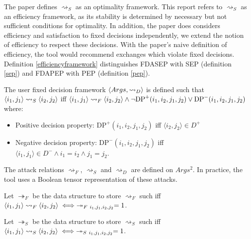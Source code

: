 The paper \cite{aes} defines $\rightsquigarrow_S$ as an optimality framework. This report refers to $\rightsquigarrow_S$ as an efficiency framework, as its stability is determined by necessary but not sufficient conditions for optimality. In addition, the paper does considers efficiency and satisfaction to fixed decisions independently, we extend the notion of efficiency to respect these decisions. With the paper's naive definition of efficiency, the tool would recommend exchanges which violate fixed decisions. Definition \ref{efficiencyframework} distinguishes FDASEP with SEP (definition \ref{sep}) and FDAPEP with PEP (definition \ref{pep}).

\begin{definition}
	\label{fixeddecisionframework}
	
	The user fixed decision framework $\langle{Args},{\rightsquigarrow_D}\rangle$ is defined such that $\langle{i_1},{j_1}\rangle\rightsquigarrow_S\langle{ i_2},{j_2}\rangle$ iff $\langle{i_1},{j_1}\rangle\rightsquigarrow_F\langle{i_2},{j_2}\rangle\land\neg\text{DP}^+(i_1,i_2,j_1,j_2)\lor\text{DP}^-(i_1,i_2,j_1,j_2)$ where:
	\begin{itemize}
		\item Positive decision property: $\text{DP}^+(i_1,i_2,j_1,j_2)$ iff $\langle i_2, j_2\rangle\in D^+$
		\item Negative decision property: $\text{DP}^-(i_1,i_2,j_1,j_2)$ iff $\langle i_1, j_1\rangle\in D^-\land i_1=i_2\land j_1=j_2$.
	\end{itemize}
\end{definition}

The attack relations $\rightsquigarrow_F$, $\rightsquigarrow_S$ and $\rightsquigarrow_D$ are defined on $Args^2$. In practice, the tool uses a Boolean tensor representation of these attacks.

\begin{definition}
	\label{tensorfeasiblityframework}
	
	Let $\twoheadrightarrow_F$ be the data structure to store $\rightsquigarrow_F$ such iff $\pair{i_1}{j_1}\rightsquigarrow_F\pair{i_2}{j_2}\iff\twoheadrightarrow_{F\ i_1,j_1,i_2,j_2}=1$.
\end{definition}

\begin{definition}
	\label{tensorefficiencyframework}
	
	Let $\twoheadrightarrow_S$ be the data structure to store $\rightsquigarrow_S$ such iff $\pair{i_1}{j_1}\rightsquigarrow_S\pair{i_2}{j_2}\iff\twoheadrightarrow_{S\ i_1,j_1,i_2,j_2}=1$.
\end{definition}

